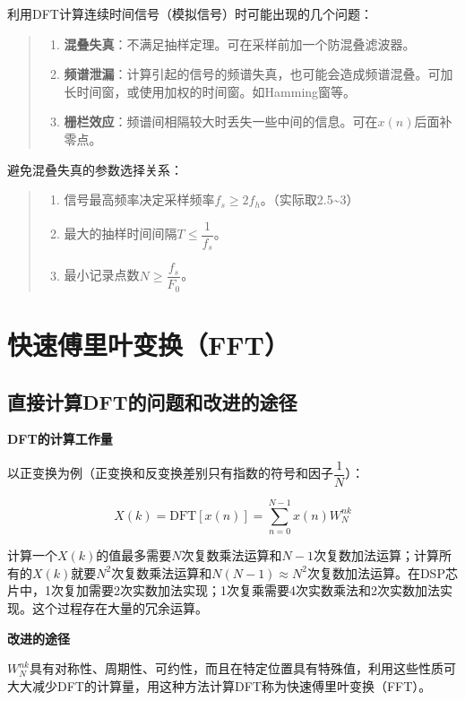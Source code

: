 \documentclass[cn, hazy, blue, normal, 12pt]{elegantnote}
\begin{document}
利用DFT计算连续时间信号（模拟信号）时可能出现的几个问题：

\begin{quote}
\begin{enumerate}
    \item \textbf{混叠失真}：不满足抽样定理。可在采样前加一个防混叠滤波器。
    \item \textbf{频谱泄漏}：计算引起的信号的频谱失真，也可能会造成频谱混叠。可加长时间窗，或使用加权的时间窗。如Hamming窗等。
    \item \textbf{栅栏效应}：频谱间相隔较大时丢失一些中间的信息。可在$x(n)$后面补零点。
\end{enumerate}
\end{quote}

避免混叠失真的参数选择关系：

\begin{quote}
\begin{enumerate}
    \item 信号最高频率决定采样频率$f_s\geq 2f_h$。（实际取2.5\textasciitilde 3）
    \item 最大的抽样时间间隔$T\leq \dfrac{1}{f_s}$。
    \item 最小记录点数$N\geq\dfrac{f_s}{F_0}$。
\end{enumerate}
\end{quote}

\section{快速傅里叶变换（FFT）}

\subsection{直接计算DFT的问题和改进的途径}

\textbf{DFT的计算工作量}

以正变换为例（正变换和反变换差别只有指数的符号和因子$\dfrac{1}{N}$）：

$$X(k)=\text{DFT}[{x}(n)]=\sum_{n=0}^{N-1}{{x}(n)W_{N}^{nk}}$$

计算一个$X(k)$的值最多需要$N$次复数乘法运算和$N-1$次复数加法运算；计算所有的$X(k)$就要$N^2$次复数乘法运算和$N(N-1)\approx N^2$次复数加法运算。在DSP芯片中，1次复加需要2次实数加法实现；1次复乘需要4次实数乘法和2次实数加法实现。这个过程存在大量的冗余运算。

\textbf{改进的途径}

$W_N^{nk}$具有对称性、周期性、可约性，而且在特定位置具有特殊值，利用这些性质可大大减少DFT的计算量，用这种方法计算DFT称为快速傅里叶变换（FFT）。
\end{document}
